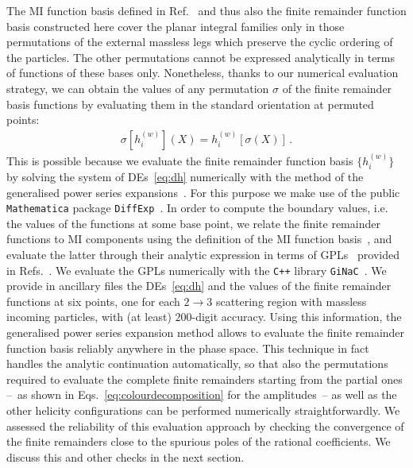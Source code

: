 \documentclass[main.tex]{subfiles}
\begin{document}
The MI function basis defined in Ref.~\cite{Badger:2021nhg} and thus also the finite remainder function basis constructed here cover the planar integral families only in those permutations of the external massless legs which preserve the cyclic ordering of the particles. The other permutations cannot be expressed analytically in terms of functions of these bases only. Nonetheless, thanks to our numerical evaluation strategy, we can obtain the values of any permutation $\sigma$ of the finite remainder basis functions by evaluating them in the standard orientation at permuted points:
\begin{align}
\sigma \left[ h^{(w)}_i \right] (X) =  h^{(w)}_i \left[\sigma\left(X\right)\right] \,.
\end{align}
This is possible because 
we evaluate the finite remainder function basis $\{h^{(w)}_i\}$ by solving the system of DEs~\ref{eq:dh} numerically with the method of the generalised power series expansions~\cite{Francesco:2019yqt}. For this purpose we make use of the public \texttt{Mathematica} package \texttt{DiffExp}~\cite{Hidding:2020ytt}. In order to compute the boundary values, i.e. the values of the functions at some base point, we relate the finite remainder functions to MI components using the definition of the MI function basis~\cite{Badger:2021nhg}, and evaluate the latter through their analytic expression in terms of GPLs~\cite{2011arXiv1105.2076G,Remiddi:1999ew,2001math......3059G} provided in Refs.~\cite{Papadopoulos:2015jft,Syrrakos:2020kba,Canko:2020ylt}. We evaluate the GPLs numerically with the \texttt{C++} library \texttt{GiNaC}~\cite{Vollinga:2004sn}. We provide in ancillary files the DEs~\ref{eq:dh} and the values of the finite remainder functions at six points, one for each $2\to 3$ scattering region with massless incoming particles, with (at least) $200$-digit accuracy. Using this information, the generalised power series expansion method allows to evaluate the finite remainder function basis reliably anywhere in the phase space. This technique in fact handles the analytic continuation automatically, so that also the permutations required to evaluate the complete finite remainders starting from the partial ones --~as shown in Eqs.~\ref{eq:colourdecomposition} for the amplitudes~-- as well as the other helicity configurations can be performed numerically straightforwardly. We assessed the reliability of this evaluation approach by checking the convergence of the finite remainders close to the spurious poles of the rational coefficients. We discuss this and other checks in the next section.
\end{document}
